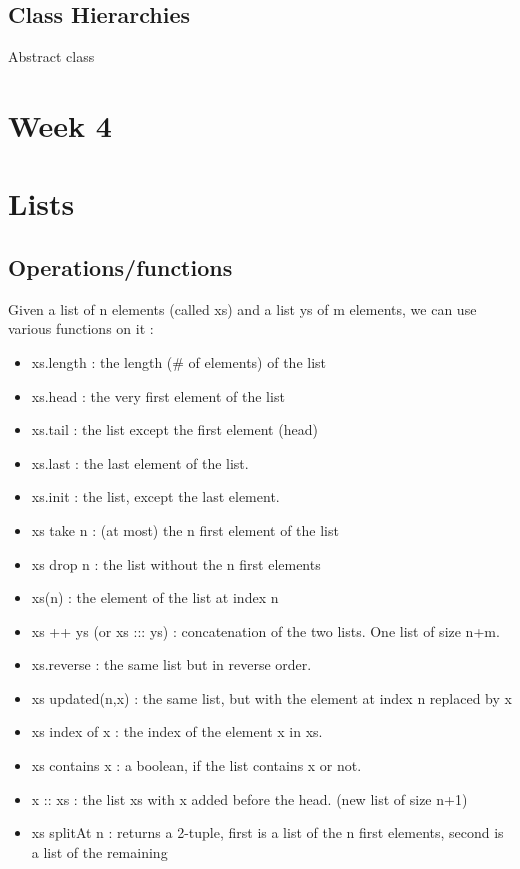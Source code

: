 \documentclass[12pt,a4paper]{article}
\begin{document}
\subsection{Class Hierarchies}
Abstract class 
\section{Week 4}
\section{Lists}
\subsection{Operations/functions}
Given a list of n elements (called xs) and a list ys of m elements, we can use various functions on it : 
\begin{itemize}
	\item 	xs.length : the length (\# of elements) of the list
	\item 	xs.head : the very first element of the list
	\item 	xs.tail : the list except the first element (head)
	\item 	xs.last : the last element of the list.
	\item 	xs.init : the list, except the last element.
	\item 	xs take n : (at most) the n first element of the list
	\item 	xs drop n : the list without the n first elements
	\item 	xs(n) : the element of the list at index n
	\item 	xs ++ ys (or xs ::: ys) : concatenation of the two lists. One list of size n+m.
	\item 	xs.reverse : the same list but in reverse order.
	\item 	xs updated(n,x) : the same list, but with the element at index n replaced by x
	\item 	xs index of x : the index of the element x in xs.
	\item 	xs contains x : a boolean, if the list contains x or not.
	\item	x :: xs : the list xs with x added before the head. (new list of size n+1)
	\item 	xs splitAt n : returns a 2-tuple, first is a list of the n first elements, second is a list of the remaining
\end{itemize}
\end{document}
